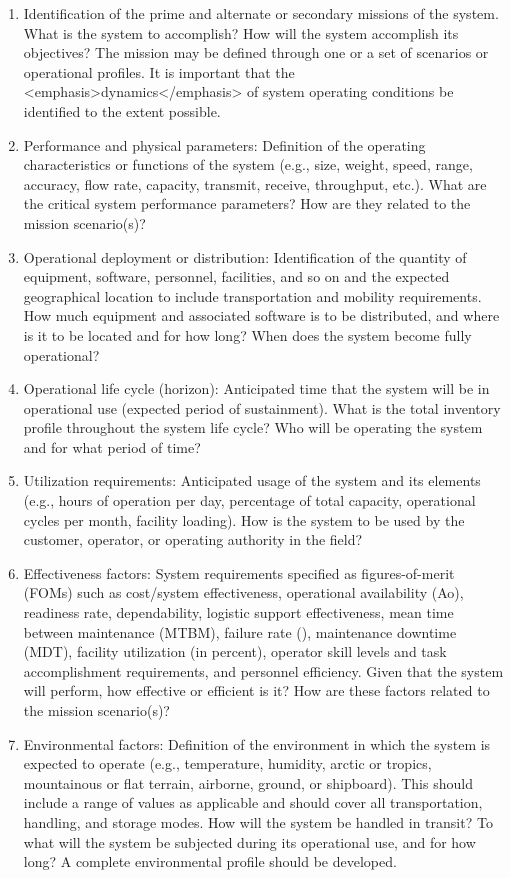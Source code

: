 \begin{enumerate}
	\item Identification of the prime and alternate or secondary missions of the system. What is the system to accomplish? How will the system accomplish its objectives? The mission may be defined through one or a set of scenarios or operational profiles. It is important that the <emphasis>dynamics</emphasis> of system operating conditions be identified to the extent possible.
	\item Performance and physical parameters: Definition of the operating characteristics or functions of the system (e.g., size, weight, speed, range, accuracy, flow rate, capacity, transmit, receive, throughput, etc.). What are the critical system performance parameters? How are they related to the mission scenario(s)?
	\item Operational deployment or distribution: Identification of the quantity of equipment, software, personnel, facilities, and so on and the expected geographical location to include transportation and mobility requirements. How much equipment and associated software is to be distributed, and where is it to be located and for how long? When does the system become fully operational?
	\item Operational life cycle (horizon): Anticipated time that the system will be in operational use (expected period of sustainment). What is the total inventory profile throughout the system life cycle? Who will be operating the system and for what period of time?
	\item Utilization requirements: Anticipated usage of the system and its elements (e.g., hours of operation per day, percentage of total capacity, operational cycles per month, facility loading). How is the system to be used by the customer, operator, or operating authority in the field?
	\item Effectiveness factors: System requirements specified as figures-of-merit (FOMs) such as cost/system effectiveness, operational availability (Ao), readiness rate, dependability, logistic support effectiveness, mean time between maintenance (MTBM), failure rate (), maintenance downtime (MDT), facility utilization (in percent), operator skill levels and task accomplishment requirements, and personnel efficiency. Given that the system will perform, how effective or efficient is it? How are these factors related to the mission scenario(s)?
	\item Environmental factors: Definition of the environment in which the system is expected to operate (e.g., temperature, humidity, arctic or tropics, mountainous or flat terrain, airborne, ground, or shipboard). This should include a range of values as applicable and should cover all transportation, handling, and storage modes. How will the system be handled in transit? To what will the system be subjected during its operational use, and for how long? A complete environmental profile should be developed.
\end{enumerate}


